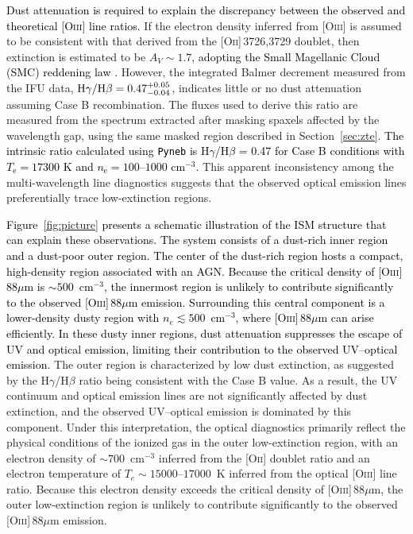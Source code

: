 \documentclass[trackchanges,twocolumn]{aastex701}
\newcommand{\cc}[1]{\textcolor{black}{#1}} %
\newcommand{\cd}[1]{\textcolor{black}{#1}} %
\newcommand{\cg}[1]{\textcolor{black}{#1}} %
\newcommand{\ckt}[1]{\textcolor{black}{#1}}
\newcommand{\cj}[1]{\textcolor{black}{#1}}
\newcommand{\ck}[1]{\textcolor{black}{#1}}
\begin{document}
\cg{Dust attenuation is required to explain the discrepancy between the observed and theoretical [\textsc{Oiii}] line ratios.} If the electron density inferred from [\textsc{Oiii}] is assumed to be consistent with that derived from the [\textsc{Oii}]\,3726,3729 doublet, then extinction is estimated to be $A_V \sim 1.7$, \ck{adopting the Small Magellanic Cloud (SMC) reddening law \citep{Gordon2003}.} However, the integrated Balmer decrement measured from the IFU data, \cc{${\rm H}\gamma/{\rm H}\beta = 0.47^{+0.05}_{-0.04}$}, indicates little or no dust attenuation assuming Case B recombination. 
The fluxes used to derive this ratio are measured from the spectrum extracted after masking spaxels affected by the wavelength gap, using the same masked region described in Section~\ref{sec:zte}. 
\cj{The intrinsic ratio calculated using \texttt{Pyneb} is H$\gamma$/H$\beta$ = 0.47 for Case B conditions with $T_{\mathrm e} = 17300$ K and $n_{\mathrm e} = 100\textrm{--}1000$ cm$^{-3}$.} This apparent inconsistency among the multi-wavelength line diagnostics suggests that the observed optical emission lines preferentially trace low-extinction regions. 


\cd{Figure~\ref{fig:picture} presents a schematic illustration of the ISM structure that can explain these observations.} \ckt{The system consists of a dust-rich inner region and a dust-poor outer region.} \cd{The center of the dust-rich region hosts a compact, high-density region associated with an AGN. Because the critical density of [\textsc{Oiii}]\,88$\mu$m is $\sim500$~cm$^{-3}$, the innermost region is unlikely to contribute significantly to the observed [\textsc{Oiii}]\,88$\mu$m emission. Surrounding this central component is a lower-density dusty region with $n_e \lesssim 500$~cm$^{-3}$, where [\textsc{Oiii}]\,88$\mu$m can arise efficiently. In these dusty inner regions, dust attenuation suppresses the escape of UV and optical emission, limiting their contribution to the observed UV--optical emission.} 
The outer region is characterized by low dust extinction, as suggested by the H$\gamma$/H$\beta$ ratio being consistent with the Case B value. As a result, the UV continuum and optical emission lines are not significantly affected by dust extinction, and the observed UV--optical emission is dominated by this component. Under this interpretation, the optical diagnostics primarily reflect the physical conditions of the ionized gas in the outer low-extinction region, with an electron density of $\sim700$~cm$^{-3}$ inferred from the [\textsc{Oii}] doublet ratio and an electron temperature of $T_e \sim15000\textrm{--}17000$~K inferred from the optical [\textsc{Oiii}] line ratio. Because this electron density exceeds the critical density of [\textsc{Oiii}]\,88$\mu$m, the outer low-extinction region is unlikely to contribute significantly to the observed [\textsc{Oiii}]\,88$\mu$m emission.
\end{document}
